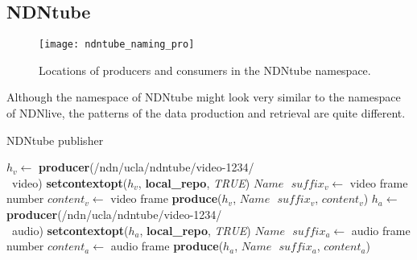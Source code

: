 \subsection{NDNtube}
\begin{figure*}[ht]
  \centering
  \texttt{[image: ndntube\_naming\_pro]}
  \caption{Locations of producers and consumers in the NDNtube namespace.}
  \label{fig:ndntube_cp}
\end{figure*}
Although the namespace of NDNtube might look very similar to the namespace of NDNlive, the patterns of the data production and retrieval are quite different. 

\begin{algorithm}[ht]
\caption{NDNtube publisher}
\label{alg:recordproducer}
\begin{algorithmic}[3]
\State $h_v \leftarrow $ \textbf{producer}(/ndn/ucla/ndntube/video-1234/ \\\ video)
\State \textbf{setcontextopt}($h_v$, \textbf{local\_repo}, \textit{TRUE})
\vspace{0.2cm}
	\State $Name \textbf{ } suffix_v \leftarrow $ video frame number
	\State $content_v \leftarrow $ video frame
	\State \textbf{produce}($h_v$, $Name\textbf{ }suffix_v$, $content_v$)
	\EndWhile
\vspace{0.2cm}
\vspace{0.2cm}
\State $h_a \leftarrow $ \textbf{producer}(/ndn/ucla/ndntube/video-1234/ \\\ audio)
\State \textbf{setcontextopt}($h_a$, \textbf{local\_repo}, \textit{TRUE})
\vspace{0.2cm}
	\State $Name \textbf{ } suffix_a \leftarrow $ audio frame number
	\State $content_a \leftarrow $ audio frame
	\State \textbf{produce}($h_a$, $Name\textbf{ }suffix_a$, $content_a$)
	\EndWhile
\end{algorithmic}
\end{algorithm}

